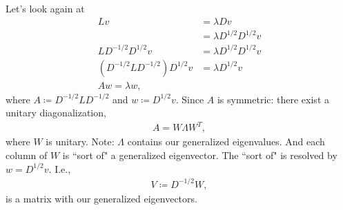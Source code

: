 \documentclass[10pt]{amsart}
\begin{document}
\begin{itemize}
    Let's look again at 
    \begin{align*}
      L v &= \lambda D v \\
          &= \lambda D^{1/2} D^{1/2} v \\
      L D^{-1/2} D^{1/2} v &= \lambda D^{1/2} D^{1/2} v \\
      \left( D^{-1/2} L D^{-1/2}\right) D^{1/2} v &= \lambda D^{1/2} v \\
      A w = \lambda w,
    \end{align*}
    where $A \coloneqq D^{-1/2} L D^{-1/2}$ and $w \coloneqq D^{1/2} v$. Since $A$ is symmetric: there exist a unitary diagonalization,
    \begin{align*}
      A = W \Lambda W^T,
    \end{align*}
    where $W$ is unitary. Note: $\Lambda$ contains our generalized eigenvalues. And each column of $W$ is ``sort of" a generalized eigenvector. The ``sort of" is resolved by $w = D^{1/2} v$. I.e., 
    \begin{align*}
      V \coloneqq D^{-1/2} W,
    \end{align*}
    is a matrix with our generalized eigenvectors.
\end{itemize}
\end{document}
